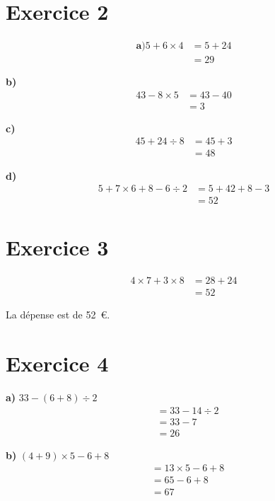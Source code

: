 \documentclass[12pt]{extarticle}
\begin{document}
\section*{Exercice 2}

\begin{align*}
\textbf{a)}
5 + 6 \times 4 &= 5 + 24 \\
               &= 29
\end{align*}

\textbf{b)}
\begin{align*}
43 - 8 \times 5 &= 43 - 40 \\
                &= 3
\end{align*}

\textbf{c)}
\begin{align*}
45 + 24 \div 8 &= 45 + 3 \\
               &= 48
\end{align*}

\textbf{d)}
\begin{align*}
5 + 7 \times 6 + 8 - 6 \div 2 &= 5 + 42 + 8 - 3 \\
                              &= 52
\end{align*}

\section*{Exercice 3}
\begin{align*}
4 \times 7 + 3 \times 8 &= 28 + 24 \\
                        &= 52
\end{align*}

La dépense est de 52~€.

\section*{Exercice 4}

\textbf{a)} $33 - (6 + 8) \div 2$
\begin{align*}
&= 33 - 14 \div 2 \\
&= 33 - 7 \\
&= 26
\end{align*}

\textbf{b)} $(4 + 9) \times 5 - 6 + 8$
\begin{align*}
&= 13 \times 5 - 6 + 8 \\
&= 65 - 6 + 8 \\
&= 67
\end{align*}
\end{document}
